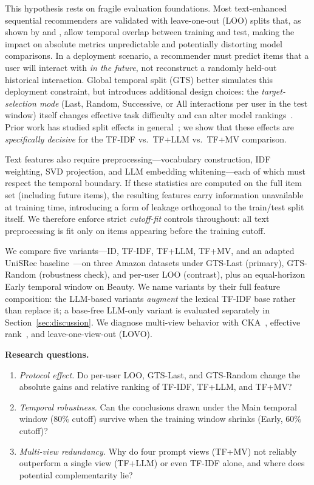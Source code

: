 \documentclass[sigconf,natbib=true,anonymous]{acmart}
\newcommand{\tfidf}{\textsc{TF-IDF}\xspace}
\newcommand{\llm}{\textsc{LLM}\xspace}
\newcommand{\tfllm}{\textsc{TF+LLM}\xspace}
\newcommand{\tfmv}{\textsc{TF+MV}\xspace}
\begin{document}
This hypothesis rests on fragile evaluation foundations.
Most text-enhanced sequential recommenders are validated with leave-one-out (LOO) splits that, as shown by \citet{ji2023evaluation} and \citet{sun2023reevaluation}, allow temporal overlap between training and test, making the impact on absolute metrics unpredictable and potentially distorting model comparisons.
In a deployment scenario, a recommender must predict items that a user will interact with \emph{in the future}, not reconstruct a randomly held-out historical interaction.
Global temporal split (GTS) better simulates this deployment constraint, but introduces additional design choices: the \emph{target-selection mode} (Last, Random, Successive, or All interactions per user in the test window) itself changes effective task difficulty and can alter model rankings~\cite{gusak2025time}.
Prior work has studied split effects in general~\cite{meng2020temporal,ji2023evaluation}; we show that these effects are \emph{specifically decisive} for the \tfidf vs.\ \tfllm vs.\ \tfmv comparison.

Text features also require preprocessing---vocabulary construction, IDF weighting, SVD projection, and LLM embedding whit\-ening---each of which must respect the temporal boundary.
If these statistics are computed on the full item set (including future items), the resulting features carry information unavailable at training time, introducing a form of leakage orthogonal to the train/test split itself.
We therefore enforce strict \emph{cutoff-fit} controls throughout: all text preprocessing is fit only on items appearing before the training cutoff.

We compare five variants---ID, \tfidf, \tfllm, \tfmv, and an adapted UniSRec baseline~\cite{hou2022unisrec}---on three Amazon datasets under GTS-Last (primary), GTS-Random (robustness check), and per-user LOO (contrast), plus an equal-horizon Early temporal window on Beauty.
We name variants by their full feature composition: the \llm-based variants \emph{augment} the lexical \tfidf base rather than replace it; a base-free LLM-only variant is evaluated separately in Section~\ref{sec:discussion}.
We diagnose multi-view behavior with CKA~\cite{kornblith2019cka}, effective rank~\cite{roy2007effective}, and leave-one-view-out (LOVO).

\medskip
\noindent\textbf{Research questions.}
\nopagebreak
\begin{enumerate}[leftmargin=*,itemsep=1pt,topsep=4pt]
\item[\textbf{RQ1}] \emph{Protocol effect.}
Do per-user LOO, GTS-Last, and GTS-Random change the absolute gains and relative ranking of \tfidf, \tfllm, and \tfmv?
\item[\textbf{RQ2}] \emph{Temporal robustness.}
Can the conclusions drawn under the Main temporal window ($80\%$ cutoff) survive when the training window shrinks (Early, $60\%$ cutoff)?
\item[\textbf{RQ3}] \emph{Multi-view redundancy.}
Why do four prompt views (\tfmv) not reliably outperform a single view (\tfllm) or even \tfidf alone, and where does potential complementarity lie?
\end{enumerate}
\end{document}
